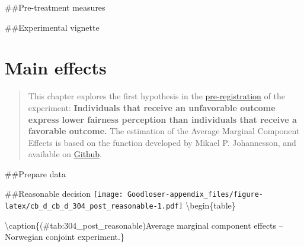 \documentclass[
]{book}
\newenvironment{Shaded}{\begin{snugshade}}{\end{snugshade}}
\newcommand{\CommentTok}[1]{\textcolor[rgb]{0.56,0.35,0.01}{\textit{#1}}}
\newcommand{\DataTypeTok}[1]{\textcolor[rgb]{0.13,0.29,0.53}{#1}}
\newcommand{\FloatTok}[1]{\textcolor[rgb]{0.00,0.00,0.81}{#1}}
\newcommand{\KeywordTok}[1]{\textcolor[rgb]{0.13,0.29,0.53}{\textbf{#1}}}
\newcommand{\NormalTok}[1]{#1}
\newcommand{\OperatorTok}[1]{\textcolor[rgb]{0.81,0.36,0.00}{\textbf{#1}}}
\newcommand{\OtherTok}[1]{\textcolor[rgb]{0.56,0.35,0.01}{#1}}
\newcommand{\StringTok}[1]{\textcolor[rgb]{0.31,0.60,0.02}{#1}}
\begin{document}
\begin{Shaded}
\end{Shaded}

\#\#Pre-treatment measures

\#\#Experimental vignette

\hypertarget{main-effects-2}{%
\chapter{Main effects}\label{main-effects-2}}

\begin{quote}
This chapter explores the first hypothesis in the \href{GoogLoser_Prereg_3_\#16823\%5B16065\%5D.pdf}{pre-registration} of the experiment: \textbf{Individuals that receive an unfavorable outcome express lower fairness perception than individuals that receive a favorable outcome.} The estimation of the Average Marginal Component Effects is based on the function developed by Mikael P. Johannesson, and available on \href{https://rdrr.io/github/mikajoh/descr2/man/amce.html}{Github}.
\end{quote}

\#\#Prepare data

\#\#Reasonable decision
\texttt{[image: Goodloser-appendix\_files/figure-latex/cb\_d\_cb\_d\_304\_post\_reasonable-1.pdf]} \textbackslash begin\{table\}

\textbackslash caption\{(\#tab:304\_post\_reasonable)Average marginal component effects -- Norwegian conjoint experiment.\}
\centering
\end{document}
